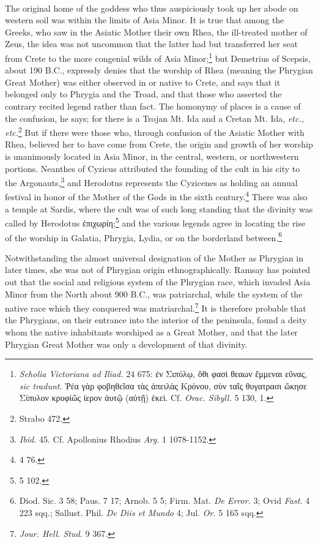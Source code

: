 \documentclass[a4paper, 11pt, oneside, polutonikogreek, english]{article}
\begin{document}
\paragraph{}
The original home of the goddess who thus auspiciously took up her abode on western soil was within the limits of Asia Minor. It is true that among the Greeks, who saw in the Asiatic Mother their own Rhea, the ill-treated mother of Zeus, the idea was not uncommon that the latter had but transferred her seat from Crete to the more congenial wilds of Asia Minor;\footnote{\emph{Scholia Victoriana ad Iliad.} 24 675: ἐν Σιπύλῳ, ὅθι φασὶ θεαων ἔμμεναι εὔνας, \emph{sic tradunt}. Ῥέα γὰρ φοβηθεῖσα τὰς ἀπειλὰς Κρόνου, σὺν ταῖς θυγατρασι ὤκησε Σίπυλον κρυφίῶς ίερον ἀυτῷ (αὐτῇ) ἐκεὶ. Cf. \emph{Orac. Sibyll.} 5 130, 1.} but Demetrius of Scepsis, about 190 \textsc{B.C.}, expressly denies that the worship of Rhea (meaning the Phrygian Great Mother) was either observed in or native to Crete, and says that it belonged only to Phrygia and the Troad, and that those who asserted the contrary recited legend rather than fact. The homonymy of places is a cause of the confusion, he says; for there is a Trojan Mt. Ida and a Cretan Mt. Ida, \emph{etc., etc.}\footnote{Strabo 472.} But if there were those who, through confusion of the Asiatic Mother with Rhea, believed her to have come from Crete, the origin and growth of her worship is unanimously located in Asia Minor, in the central, western, or northwestern portions. Neanthes of Cyzicus attributed the founding of the cult in his city to the Argonauts,\footnote{\emph{Ibid.} 45. Cf. Apollonius Rhodius \emph{Arg.} 1 1078-1152.} and Herodotus represents the Cyzicenes as holding an annual festival in honor of the Mother of the Gods in the sixth century.\footnote{4 76.} There was also a temple at Sardis, where the cult was of such long standing that the divinity was called by Herodotus ἐπιχωρίη;\footnote{5 102.} and the various legends agree in locating the rise of the worship in Galatia, Phrygia, Lydia, or on the borderland between.\footnote{Diod. Sic. 3 58; Paus. 7 17; Arnob. 5 5; Firm. Mat. \emph{De Error.} 3; Ovid \emph{Fast.} 4 223 sqq.; Sallust. Phil. \emph{De Diis et Mundo} 4; Jul. \emph{Or.} 5 165 sqq.}

Notwithstanding the almost universal designation of the Mother as Phrygian in later times, she was not of Phrygian origin ethnographically. Ramsay has pointed out that the social and religious system of the Phrygian race, which invaded Asia Minor from the North about 900 \textsc{B.C.}, was patriarchal, while the system of the native race which they conquered was matriarchal.\footnote{\emph{Jour. Hell. Stud.} 9 367.} It is therefore probable that the Phrygians, on their entrance into the interior of the peninsula, found a deity whom the native inhabitants worshiped as a Great Mother, and that the later Phrygian Great Mother was only a development of that divinity.
\end{document}
